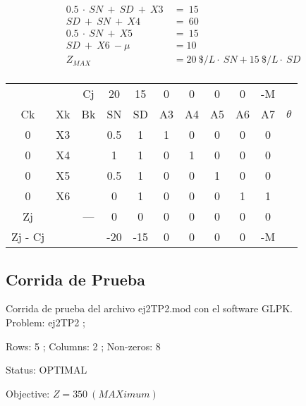 \documentclass[a4paper,10pt]{article}
\begin{document}
\begin{align*}
0.5\ \cdot \ SN\ +\ SD \ +\ X3 \ &= \ 15  \\
SD\ +\ SN \ +\ X4 \ &= \ 60  \\
0.5\ \cdot \ SN\ +\ X5 \ &= \ 15  \\
SD \ +\ X6 \ - \mu \ &= 10  \\
Z_{MAX} &= 20 \ \$/L \cdot \ SN + 15 \ \$/L \cdot \ SD \\
\end{align*}

\begin{center}
 \begin{tabular}{| c c c | c  c  c  c  c  c  c  c |}
    \hline
     	&  	  &   Cj   &   20     &   15   &   0    &   0   &   0     &   0      &   -M    	   	&	       \\ 
    Ck 	&   Xk    &   Bk   &   SN    &   SD    &   A3   &   A4   &   A5   &   A6   &   A7		&  $\theta$    \\ \hline
    0   &   X3    &        &   0.5   &   1     &   1    &   0    &   0   &   0   &   0   			&    		\\
    0 	&   X4    &        &   1     &   1     &   0    &   1    &   0   &   0   &   0   			& 	        \\ 
    0 	&   X5    &        &    0.5  &   1     &   0    &   0    &   1   &   0   &   0   			&    		\\ 
    0 	&   X6    &   	    &   0     &   1     &   0    &   0    &   0   &   1   &   1   			&    		\\ \hline
    Zj 	&         & ---    &   0     &   0     &   0    &   0    &   0   &   0   &   0    	&    		\\ 
    Zj - Cj 	  &        &         &   -20   &   -15   &   0   &   0   &   0   &   0    		&   -M   &    \\ 
    \hline
 \end{tabular}
\end{center}


\subsection{Corrida de Prueba}
Corrida de prueba del archivo ej2TP2.mod con el software GLPK.\\


Problem:     ej2TP2 ;

Rows:        5  ; Columns:     2 ; Non-zeros:   8 

Status:      OPTIMAL 

Objective:   $Z    =   350 \   (MAXimum) $
\end{document}
